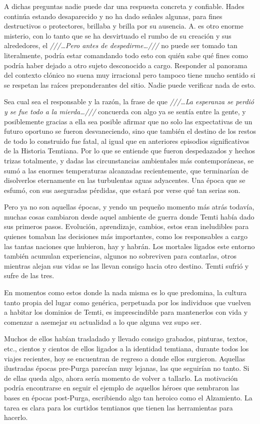 \documentclass[
  spanish,
]{book}
\begin{document}
A dichas preguntas nadie puede dar una respuesta concreta y confiable. Hades continúa estando desaparecido y no ha dado señales algunas, para fines destructivos o protectores, brillaba y brilla por su ausencia. A. es otro enorme misterio, con lo tanto que se ha desvirtuado el rumbo de su creación y sus alrededores, el \emph{///\ldots Pero antes de despedirme\ldots///} no puede ser tomado tan literalmente, podría estar comandando todo esto con quién sabe qué fines como podría haber dejado a otro sujeto desconocido a cargo. Responder al panorama del contexto clónico no suena muy irracional pero tampoco tiene mucho sentido si se respetan las raíces preponderantes del sitio. Nadie puede verificar nada de esto.

Sea cual sea el responsable y la razón, la frase de que \emph{///\ldots La esperanza se perdió y se fue todo a la mierda\ldots///} concuerda con algo ya se sentía entre la gente, y posiblemente gracias a ella sea posible afirmar que no solo las expectativas de un futuro oportuno se fueron desvaneciendo, sino que también el destino de los restos de todo lo construido fue fatal, al igual que en anteriores episodios significativos de la Historia Temtiana. Por lo que se entiende que fueron despedazados y hechos trizas totalmente, y dadas las circunstancias ambientales más contemporáneas, se sumó a las enormes temperaturas alcanzadas recientemente, que terminarían de disolverlos eternamente en las turbulentas aguas adyacentes. Una época que se esfumó, con sus aseguradas pérdidas, que estará por verse qué tan serias son.

Pero ya no son aquellas épocas, y yendo un pequeño momento más atrás todavía, muchas cosas cambiaron desde aquel ambiente de guerra donde Temti había dado sus primeros pasos. Evolución, aprendizaje, cambios, estos eran ineludibles para quienes tomaban las decisiones más importantes, como los responsables a cargo las tantas naciones que hubieron, hay y habrán. Los mortales ligados este entorno también acumulan experiencias, algunos no sobreviven para contarlas, otros mientras alejan sus vidas se las llevan consigo hacia otro destino. Temti sufrió y sufre de las tres.

En momentos como estos donde la nada misma es lo que predomina, la cultura tanto propia del lugar como genérica, perpetuada por los individuos que vuelven a habitar los dominios de Temti, es imprescindible para mantenerlos con vida y comenzar a asemejar su actualidad a lo que alguna vez supo ser.

Muchos de ellos habían trasladado y llevado consigo grabados, pinturas, textos, etc., cientos y cientos de ellos ligados a la identidad temtiana, durante todos los viajes recientes, hoy se encuentran de regreso a donde ellos surgieron. Aquellas ilustradas épocas pre-Purga parecían muy lejanas, las que seguirían no tanto. Si de ellas queda algo, ahora sería momento de volver a tallarlo. La motivación podría encontrarse en seguir el ejemplo de aquellos héroes que sembraron las bases en épocas post-Purga, escribiendo algo tan heroico como el Alzamiento. La tarea es clara para los curtidos temtianos que tienen las herramientas para hacerlo.
\end{document}

